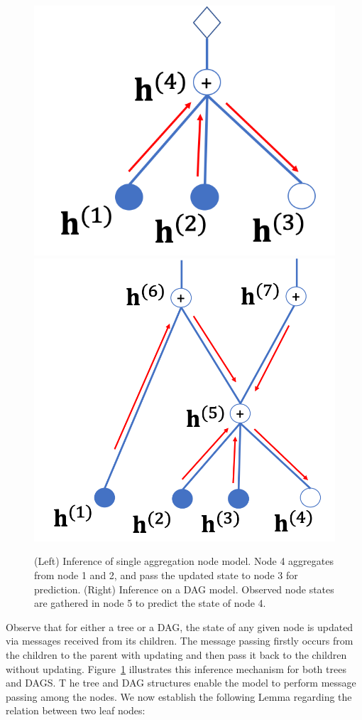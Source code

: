 \documentclass{article} %
\begin{document}
\begin{figure}
\begin{center}
 \includegraphics[width=0.4\linewidth]{fig/two_layer_infer.png}
 \hspace{0.15in}
 \includegraphics[width=0.5\linewidth]{fig/dag_infer.png}
\end{center}
\vspace{-0.2in}
 \caption{{\small (Left) Inference of single aggregation node model. Node 4 aggregates from node 1 and 2, and  pass the updated state to node 3 for prediction. (Right) Inference on a DAG model. Observed node states are gathered in node 5 to predict the state of node 4.}}
\label{fig:two_layer_infer}
\vspace{-0.2in}
\end{figure}
Observe that for either a tree or a DAG, the state of any given node is updated via messages received from its children. 
The message passing firstly occurs from the children to the parent with updating and then pass it back to the children without updating. 
Figure~\ref{fig:two_layer_infer} illustrates this inference mechanism for both trees and DAGS. T
he tree and DAG structures enable the model to perform message passing among the nodes.  
We now establish the following Lemma regarding the relation between two leaf nodes:
\end{document}
